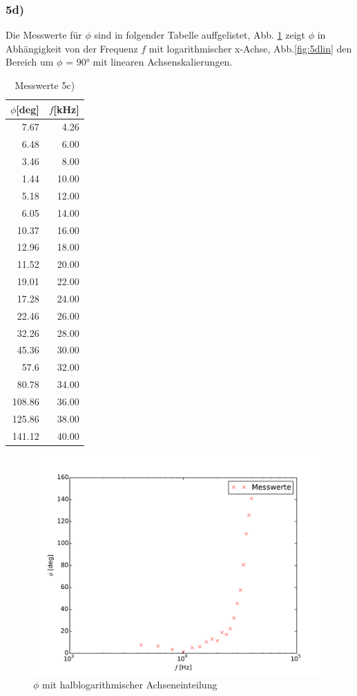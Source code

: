 \subsubsection{5d)}
Die Messwerte für $\phi$ sind in folgender Tabelle auffgelistet, Abb.
\ref{fig:5dlog} zeigt $\phi$ in Abhängigkeit von der Frequenz $f$ mit
logarithmischer x-Achse, Abb.\ref{fig:5dlin} den Bereich um $\phi$ = 90° mit
linearen Achsenskalierungen.
\begin{table}
\centering
\caption{Messwerte 5c)}
\label{tab:5c}
\begin{tabular}{rr}
\toprule
{$\phi$[deg]} &{$f$[kHz]}\\
\midrule
7.67 & 4.26 \\
6.48 & 6.00 \\
3.46 & 8.00 \\
1.44 & 10.00 \\
5.18 & 12.00 \\
6.05 & 14.00 \\
10.37 & 16.00 \\
12.96 & 18.00 \\
11.52 & 20.00 \\
19.01 & 22.00 \\
17.28 & 24.00 \\
22.46 & 26.00 \\
32.26 & 28.00 \\
45.36 & 30.00 \\
57.6 & 32.00 \\
80.78 & 34.00 \\
108.86 & 36.00 \\
125.86 & 38.00 \\
141.12 & 40.00 \\
\bottomrule
\end{tabular}
\end{table}

\begin{figure}
  \centering
  \includegraphics[width=\textwidth]{5d.pdf}
  \caption{$\phi$ mit halblogarithmischer Achseneinteilung}
  \label{fig:5dlog}
\end{figure}

